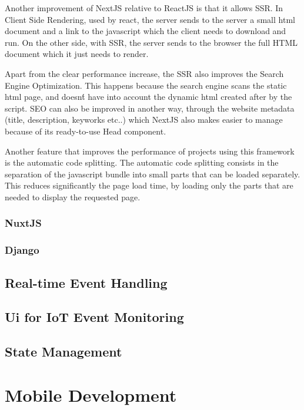 Another improvement of NextJS relative to ReactJS is that it allows SSR. In
Client Side Rendering, used by react, the server sends to the server a small
html document and a link to the javascript which the client needs to download
and run. On the other side, with SSR, the server sends to the browser the
full HTML document which it just needs to render\cite{Salanke_A.R_G.S_Dalali_2022}.

Apart from the clear performance increase, the SSR also improves the Search
Engine Optimization. This happens because the search engine scans the static
html page, and doesn\'t have into account the dynamic html created after by
the script. SEO can also be improved in another way, through the website
metadata (title, description, keyworks etc..) which NextJS also makes easier to
manage because of its ready-to-use Head component.

Another feature that improves the performance of projects using this framework
is the automatic code splitting. The automatic code splitting consists in
the separation of the javascript bundle into small parts that can be loaded
separately. This reduces significantly the page load time, by loading only the
parts that are needed to display the requested page.

\subsubsection{NuxtJS}
\subsubsection{Django}
\subsection{Real-time Event Handling}

\subsection{Ui for IoT Event Monitoring}

\subsection{State Management}

\section{Mobile Development}

